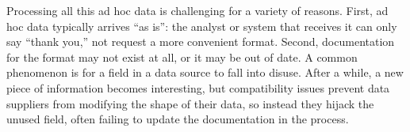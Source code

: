 \documentclass[11pt]{article}
\begin{document}


Processing all this ad hoc data is challenging for a variety of reasons. 
First, ad hoc data typically arrives ``as is'': the analyst or system
that receives it can only say ``thank you,'' not request a more
convenient format.  Second, documentation for the format may not exist
at all, or it may be out of date.  A common phenomenon is for a field
in a data source to fall into disuse.  After a while, a new piece of
information becomes interesting, but compatibility issues prevent data
suppliers from modifying the shape of their data, so instead they
hijack the unused field, often failing to update the documentation in
the process.
\end{document}
